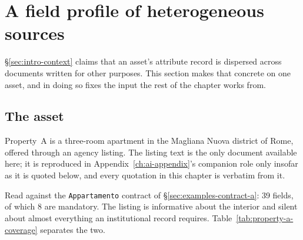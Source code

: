 \section{A field profile of heterogeneous sources}
\label{sec:examples-sources}

\S\ref{sec:intro-context} claims that an asset's attribute record is dispersed across documents written for other purposes. This section makes that concrete on one asset, and in doing so fixes the input the rest of the chapter works from.

\subsection{The asset}
\label{sec:examples-property-a}

Property~A is a three-room apartment in the Magliana Nuova district of Rome, offered through an agency listing. The listing text is the only document available here; it is reproduced in Appendix~\ref{ch:ai-appendix}'s companion role only insofar as it is quoted below, and every quotation in this chapter is verbatim from it.

Read against the \texttt{Appartamento} contract of \S\ref{sec:examples-contract-a}: 39 fields, of which 8 are mandatory. The listing is informative about the interior and silent about almost everything an institutional record requires. Table~\ref{tab:property-a-coverage} separates the two.

